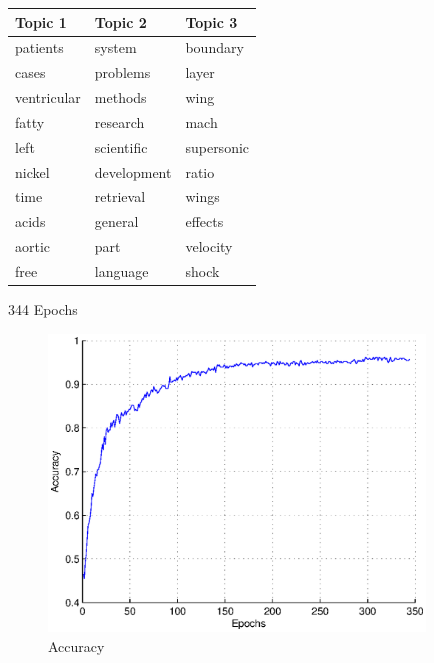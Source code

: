 \documentclass[10pt,twocolumn,letterpaper]{article}
\begin{document}
\begin{table}
    \begin{tabular}{|l|l|l|}
        \hline
        Topic 1 & Topic 2 & Topic 3 \\
    		\hline    
			  patients   &   system   &   boundary  \\
			  cases   &   problems   &   layer \\
			  ventricular   &   methods   &   wing  \\
			  fatty   &   research   &   mach  \\
			  left   &   scientific   &   supersonic  \\
			  nickel   &   development   &   ratio\\
			  time   &   retrieval   &   wings \\
			  acids   &   general   &   effects\\
			  aortic   &   part   &   velocity\\
			  free   &   language   &   shock\\
			  \hline
    \end{tabular}
\end{table}


344 Epochs


\begin{figure}[htbp] 
\centering
   \begin{minipage}{10 cm}
   \centering
    \includegraphics[width=10cm]{images/accuracygrid}
    \end{minipage}
  \caption{Accuracy}
  \label{Labelname}
\end{figure}
\end{document}
